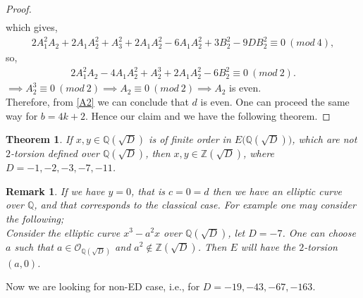 \documentclass[12pt,leqno]{amsart}
\newcommand{\<}{\langle}
\renewcommand{\>}{\rangle}
\newtheorem{theorem}{Theorem}
\newtheorem{rmk}{Remark}
\theoremstyle{definition}
\numberwithin{equation}{section}
\begin{document}
\begin{proof}
\begin{align*}
    \end{align*}
    which gives,
    \begin{align*}
        2A_1^2A_2+2A_1A_2^2+A_3^2+2A_1A_2^2-6A_1A_2^2+3B_2^2-9DB_2^2\equiv 0~(mod~4),
    \end{align*}
    so,
    \begin{align*}
        2A_1^2A_2-4A_1A_2^2+A_2^3+2A_1A_2^2-6B_2^2\equiv0~(mod~2).
    \end{align*}
    $\implies A_2^3\equiv 0~(mod~2)\implies A_2\equiv 0~(mod~2)\implies A_2$ is even. \\
    Therefore, from \eqref{A2} we can conclude that $d$ is even. One can proceed the same way for $b=4k+2$. Hence our claim and we have the following theorem.
\end{proof}

\begin{theorem}\label{thm1}
    If $x,y\in \mathbb Q(\sqrt{D})$ is of finite order in $E({\mathbb Q(\sqrt{D}))}$, which are not $2$-torsion defined over $\mathbb{Q}(\sqrt{D})$, then $x,y\in \mathbb Z(\sqrt{D})$, where $D=-1, -2, -3,-7,-11$.
\end{theorem}
\begin{rmk}
    If we have $y=0$, that is $c=0=d$ then we have an elliptic curve over $\mathbb{Q}$, and that corresponds to the classical case. For example one may consider the following;\\
    Consider the elliptic curve $x^3-a^2x$ over $\mathbb{Q}(\sqrt{D})$, let $D=-7$. One can choose  $a$ such that $a\in \mathcal{O}_{\mathbb{Q}(\sqrt{D})}$ and $a^2\not\in \mathbb{Z}(\sqrt{D})$. Then $E$ will have the $2$-torsion $(a,0)$.
\end{rmk}



Now we are looking for non-ED case, i.e., for $D=-19, -43, -67, -163.$\\
\end{document}

